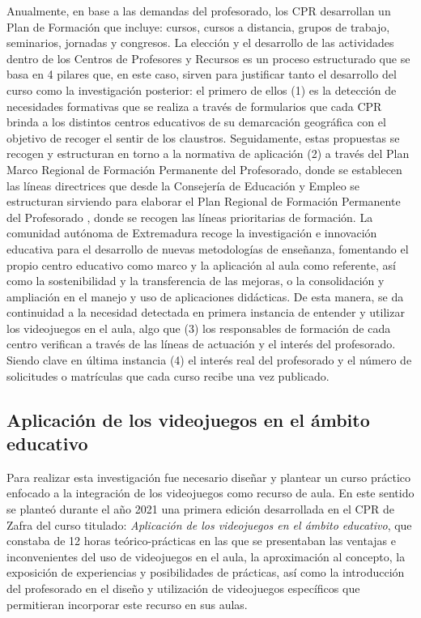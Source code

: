\documentclass[spanish]{textolivre}
\begin{document}
Anualmente, en base a las demandas del profesorado, los CPR desarrollan un Plan de Formación que incluye: cursos, cursos a distancia, grupos de trabajo, seminarios, jornadas y congresos. La elección y el desarrollo de las actividades dentro de los Centros de Profesores y Recursos es un proceso estructurado que se basa en 4 pilares que, en este caso, sirven para justificar tanto el desarrollo del curso como la investigación posterior: el primero de ellos (1) es la detección de necesidades formativas que se realiza a través de formularios que cada CPR brinda a los distintos centros educativos de su demarcación geográfica con el objetivo de recoger el sentir de los claustros. Seguidamente, estas propuestas se recogen y estructuran en torno a la normativa de aplicación (2) a través del Plan Marco Regional de Formación Permanente del Profesorado, donde se establecen las líneas directrices que desde la Consejería de Educación y Empleo se estructuran \cite{extremadura2016plan} sirviendo para elaborar el Plan Regional de Formación Permanente del Profesorado \cite{extremadura2022plan}, donde se recogen las líneas prioritarias de formación. La comunidad autónoma de Extremadura recoge la investigación e innovación educativa para el desarrollo de nuevas metodologías de enseñanza, fomentando el propio centro educativo como marco y la aplicación al aula como referente, así como la sostenibilidad y la transferencia de las mejoras, o la consolidación y ampliación en el manejo y uso de aplicaciones didácticas. De esta manera, se da continuidad a la necesidad detectada en primera instancia de entender y utilizar los videojuegos en el aula, algo que (3) los responsables de formación de cada centro verifican a través de las líneas de actuación y el interés del profesorado. Siendo clave en última instancia (4) el interés real del profesorado y el número de solicitudes o matrículas que cada curso recibe una vez publicado.


\subsection{Aplicación de los videojuegos en el ámbito educativo}\label{sec-fmt-manuscrito}
Para realizar esta investigación fue necesario diseñar y plantear un curso práctico enfocado a la integración de los videojuegos como recurso de aula. En este sentido se planteó durante el año 2021 una primera edición desarrollada en el CPR de Zafra del curso titulado: \textit{Aplicación de los videojuegos en el ámbito educativo}, que constaba de 12 horas teórico-prácticas en las que se presentaban las ventajas e inconvenientes del uso de videojuegos en el aula, la aproximación al concepto, la exposición de experiencias y posibilidades de prácticas, así como la introducción del profesorado en el diseño y utilización de videojuegos específicos que permitieran incorporar este recurso en sus aulas.
\end{document}

